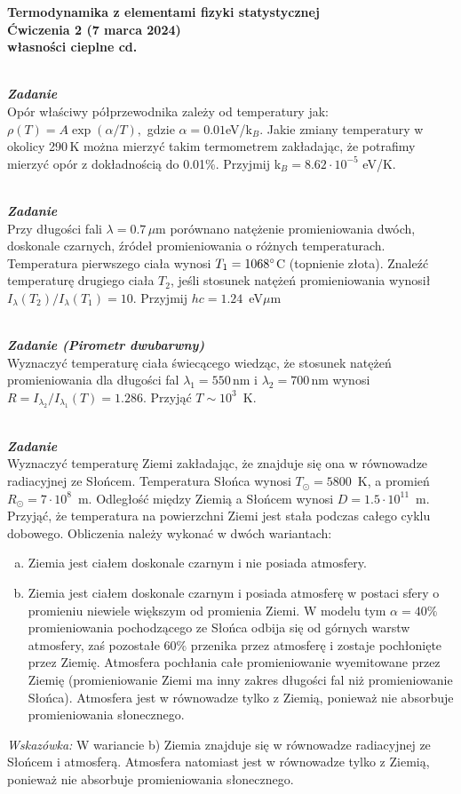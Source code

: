 \documentclass[11pt,a4paper]{article}
\newcounter{zadanie}\newcommand{\zadanie}[1][]{\addtocounter{zadanie}{1} ~\\  {\bf \emph{Zadanie \arabic{zadanie} #1 }} \\}
\begin{document}
\vspace*{-1.8cm}

\begin{centering}
\bf{\Large{Termodynamika z elementami fizyki statystycznej}}\\
Ćwiczenia 2 (7 marca 2024)\\[1mm]
własności cieplne cd. \\
\end{centering}


\zadanie
Opór właściwy półprzewodnika zależy od temperatury jak:
$ \rho(T) = A \exp{(\alpha / T)}, $ 
gdzie $\alpha = 0.01$eV/k$_B$.
Jakie zmiany temperatury  w okolicy 290\,K można mierzyć takim termometrem
zakładając, że potrafimy mierzyć opór z dokładnością do 0.01\%.
Przyjmij k$_B = 8.62 \cdot 10^{-5}$ eV/K.

\zadanie
Przy długości fali $\lambda = 0.7\,\mu$m porównano natężenie promieniowania dwóch,
doskonale czarnych, źródeł promieniowania o różnych temperaturach.
Temperatura pierwszego ciała wynosi $T_1 = 1068 \degree$C (topnienie złota). 
Znaleźć temperaturę drugiego ciała $T_2$, jeśli stosunek natężeń promieniowania 
wynosił $I_\lambda (T_2)/I_\lambda (T_1) = 10$.
Przyjmij $hc = 1.24$~eV$\mu$m

\zadanie [(Pirometr dwubarwny)]
Wyznaczyć temperaturę ciała świecącego wiedząc, że stosunek natężeń promieniowania dla długości fal
$\lambda_1=550$\,nm i $\lambda_2=700$\,nm wynosi $R=I_{\lambda_2}/I_{\lambda_1}(T)=1.286$.
Przyjąć $T \sim 10^{3}$~K.

\zadanie

Wyznaczyć temperaturę Ziemi zakładając, że znajduje się ona w równowadze radiacyjnej ze
Słońcem. Temperatura Słońca wynosi $T_\odot = 5800$~K, a promień $R_\odot = 7 \cdot 10^8$~m.
Odległość między Ziemią a Słońcem wynosi $D = 1.5 \cdot 10^{11}$~m. 
Przyjąć, że temperatura na powierzchni Ziemi jest stała podczas całego cyklu dobowego.
Obliczenia należy wykonać w dwóch wariantach:\\
\begin{enumerate}[a)]
        \item Ziemia jest ciałem doskonale czarnym i nie posiada atmosfery.
        \item Ziemia jest ciałem doskonale czarnym i posiada atmosferę w postaci sfery o promieniu niewiele większym od promienia Ziemi. 
        W modelu tym $\alpha=40\%$ promieniowania pochodzącego ze Słońca odbija się od górnych warstw atmosfery, zaś pozostałe $60\%$ 
        przenika przez atmosferę i zostaje pochłonięte przez Ziemię. Atmosfera pochłania całe promieniowanie wyemitowane przez Ziemię
  (promieniowanie Ziemi ma inny zakres długości fal niż promieniowanie Słońca). Atmosfera jest w równowadze tylko z Ziemią, 
  ponieważ nie absorbuje promieniowania słonecznego.
\end{enumerate}
{\it Wskazówka: }
W wariancie b) Ziemia znajduje się w równowadze radiacyjnej ze Słońcem i atmosferą. 
Atmosfera natomiast jest w równowadze tylko z Ziemią, ponieważ nie absorbuje promieniowania słonecznego.
\end{document}
